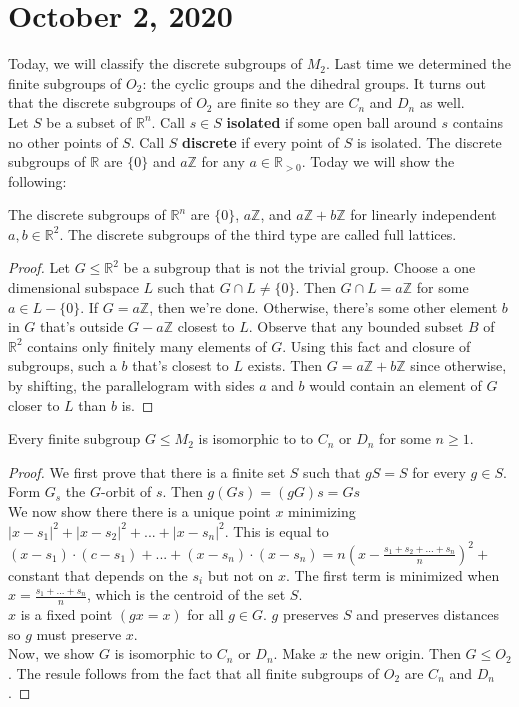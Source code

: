 \documentclass{article}
\newcommand{\vocab}[1]{\textbf{\color{blue!90}\boldmath #1}}
\newcommand{\R}{\mathbb{R}}
\newcommand{\Z}{\mathbb{Z}}
\begin{document}
\section{October 2, 2020}
Today, we will classify the discrete subgroups of $M_2$. Last time we determined the finite subgroups of $O_2$: the cyclic groups and the dihedral groups. It turns out that the discrete subgroups of $O_2$ are finite so they are $C_n$ and $D_n$ as well.\\
Let $S$ be a subset of $\R^n$. Call $s\in S$ \vocab{isolated} if some open ball around $s$ contains no other points of $S$. Call $S$ \vocab{discrete} if every point of $S$ is isolated. The discrete subgroups of $\R$ are $\{0\}$ and $a\Z$ for any $a\in\R_{>0}$. Today we will show the following:
\begin{theorem}
The discrete subgroups of $\R^n$ are $\{0\}$, $a\Z$, and $a\Z+b\Z$ for linearly independent $a,b\in \R^2$. The discrete subgroups of the third type are called full lattices.
\end{theorem}
\begin{proof}
Let $G\leq \R^2$ be a subgroup that is not the trivial group. Choose a one dimensional subspace $L$ such that $G\cap L\neq \{0\}$. Then $G\cap L=a\Z$ for some $a\in L-\{0\}$. If $G=a\Z$, then we're done. Otherwise, there's some other element $b$ in $G$ that's outside $G-a\Z$ closest to $L$. Observe that any bounded subset $B$ of $\R^2$ contains only finitely many elements of $G$. Using this fact and closure of subgroups, such a $b$ that's closest to $L$ exists. Then $G=a\Z+b\Z$ since otherwise, by shifting, the parallelogram with sides $a$ and $b$ would contain an element of $G$ closer to $L$ than $b$ is.
\end{proof}
\begin{theorem}
Every finite subgroup $G\leq M_2$ is isomorphic to to $C_n$ or $D_n$ for some $n\geq 1$.
\end{theorem}
\begin{proof}
We first prove that there is a finite set $S$ such that $gS=S$ for every $g\in S$. Form $G_s$ the $G$-orbit of $s$. Then $g(Gs)=(gG)s=Gs$\\
We now show there there is a unique point $x$ minimizing $|x-s_1|^2+|x-s_2|^2+...+|x-s_n|^2$. This is equal to $(x-s_1)\cdot (c-s_1)+...+(x-s_n)\cdot (x-s_n)=n(x-\frac{s_1+s_2+...+s_n}{n})^2+$ constant that depends on the $s_i$ but not on $x$. The first term is minimized when $x=\frac{s_1+...+s_n}{n}$, which is the centroid of the set $S$.\\
$x$ is a fixed point $(gx=x)$ for all $g\in G$. $g$ preserves $S$ and preserves distances so $g$ must preserve $x$.\\
Now, we show $G$ is isomorphic to $C_n$ or $D_n$. Make $x$ the new origin. Then $G\leq O_2$. The resule follows from the fact that all finite subgroups of $O_2$ are $C_n$ and $D_n$.
\end{proof}
\end{document}
